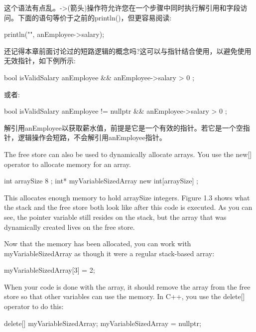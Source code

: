 这个语法有点乱。->(箭头)操作符允许您在一个步骤中同时执行解引用和字段访问。下面的语句等价于之前的println()，但更容易阅读:

\begin{cpp}
println("{}", anEmployee->salary);
\end{cpp}

还记得本章前面讨论过的短路逻辑的概念吗?这可以与指针结合使用，以避免使用无效指针，如下例所示:

\begin{cpp}
bool isValidSalary { anEmployee && anEmployee->salary > 0 };
\end{cpp}

或者:

\begin{cpp}
bool isValidSalary { anEmployee != nullptr && anEmployee->salary > 0 };
\end{cpp}

解引用anEmployee以获取薪水值，前提是它是一个有效的指针。若它是一个空指针，逻辑操作会短路，不会解引用anEmployee指针。


The free store can also be used to dynamically allocate arrays. You use the new[] operator to allocate memory for an array.

\begin{cpp}
int arraySize { 8 };
int* myVariableSizedArray { new int[arraySize] };
\end{cpp}

This allocates enough memory to hold arraySize integers. Figure 1.3 shows what the stack and the free store both look like after this code is executed. As you can see, the pointer variable still resides on the stack, but the array that was dynamically created lives on the free store.

Now that the memory has been allocated, you can work with myVariableSizedArray as though it were a regular stack-based array:

\begin{cpp}
myVariableSizedArray[3] = 2;
\end{cpp}

When your code is done with the array, it should remove the array from the free store so that other variables can use the memory. In C++, you use the delete[] operator to do this:

\begin{cpp}
delete[] myVariableSizedArray;
myVariableSizedArray = nullptr;
\end{cpp}

